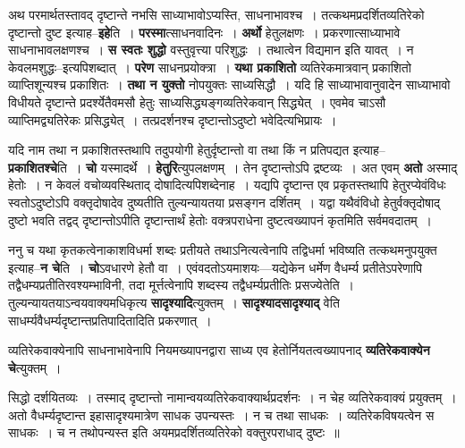 \documentclass[article,12pt,a4paper]{memoir}
\begin{document}
	  \pstart अथ परमार्थतस्तावद् दृष्टान्ते नभसि साध्याभावोऽप्यस्ति, साधनाभावश्च । तत्कथमप्रदर्शितव्यतिरेको दृष्टान्तो दुष्ट इत्याह--\textbf{इहे}ति । \textbf{परस्मा}त्साधनवादिनः । \textbf{अर्थो} हेतुलक्षणः । प्रकरणात्साध्याभावे साधनाभावलक्षणश्च । \textbf{स स्वतः शुद्धो} वस्तुवृत्त्या परिशुद्धः । तथात्वेन विद्यमान इति यावत् । न केवलमशुद्धः--इत्यपिशब्दात् । \textbf{परेण} साधनप्रयोक्त्रा । \textbf{यथा प्रकाशितो} व्यतिरेकमात्रवान् प्रकाशितो व्याप्तिशून्यश्च प्रकाशितः । \textbf{तथा न युक्तो} नोपयुक्तः साध्यसिद्धौ । यदि हि साध्याभावानुवादेन साध्याभावो विधीयते दृष्टान्ते प्रदर्श्येतैवमसौ हेतुः साध्यसिद्ध्यङ्गव्यतिरेकवान् सिद्ध्येत् । एवमेव चाऽसौ व्याप्तिमद्व्यतिरेकः प्रसिद्ध्येत् । तत्प्रदर्शनश्च दृष्टान्तोऽदुष्टो भवेदित्यभिप्रायः ।
	\pend
      

	  \pstart यदि नाम तथा न प्रकाशितस्तथापि तदुपयोगी हेतुर्दृष्टान्तो वा तथा किं न प्रतिपद्यत इत्याह--\textbf{प्रकाशितश्चे}ति । \textbf{चो} यस्मादर्थे । \textbf{हेतुरि}त्युपलक्षणम् । तेन दृष्टान्तोऽपि द्रष्टव्यः । अत एवम् \textbf{अतो} अस्माद् हेतोः । न केवलं वचोव्यवस्थिताद् दोषादित्यपिशब्देनाह । यद्यपि दृष्टान्त एव प्रकृतस्तथापि हेतुरप्येवंविधः स्वतोऽदुष्टोऽपि वक्तृदोषादेव दुष्यतीति तुल्यन्यायतया प्रसङ्गन दर्शितम् । यद्वा यथैवंविधो हेतुर्वक्तृदोषाद् दुष्टो भवति तद्वद् दृष्टान्तोऽपीति दृष्टान्तार्थं हेतोः वक्त्रपराधेना दुष्टत्वख्यापनं कृतमिति सर्वमवदातम् ।
	\pend
      

	  \pstart \leavevmode{} ननु च यथा कृतकत्वेनाकाशविधर्मा शब्दः प्रतीयते तथाऽनित्यत्वेनापि तद्विधर्मा भविष्यति तत्कथमनुपयुक्त इत्याह--\textbf{न चे}ति । \textbf{चो}ऽवधारणे हेतौ वा । एवंवदतोऽयमाशयः—यद्येकेन धर्मेण वैधर्म्य प्रतीतेऽपरेणापि तद्वैधम्यप्रतीतिरवश्यम्भाविनी, तदा मूर्त्तत्वेनापि शब्दस्य तद्वैधर्म्यप्रतीतिः प्रसज्येतेति । तुल्यन्यायतयाऽन्वयवाक्यमधिकृत्य \textbf{सादृश्यादि}त्युक्तम् । \textbf{सादृश्यादसादृश्याद्} वेति साधर्म्यवैधर्म्यदृष्टान्तप्रतिपादितादिति प्रकरणात् ।
	\pend
      

	  \pstart व्यतिरेकवाक्येनापि साधनाभावेनापि नियमख्यापनद्वारा साध्य एव हेतोर्नियतत्वख्यापनाद् \textbf{व्यतिरेकवाक्येन चे}त्युक्तम् ।
	\pend
	  \bigskip
	  \begingroup
	

	  \pstart सिद्धो दर्शयितव्यः । तस्माद् दृष्टान्तो नामान्वयव्यतिरेकवाक्यार्थप्रदर्शनः । न चेह व्यतिरेकवाक्यं प्रयुक्तम् । अतो वैधर्म्यदृष्टान्त इहासादृश्यमात्रेण साधक उपन्यस्तः । न च तथा साधकः । व्यतिरेकविषयत्वेन स साधकः । च न तथोपन्यस्त इति अयमप्रदर्शितव्यतिरेको वक्तुरपराधाद् दुष्टः ॥
	\pend
        
\end{document}
